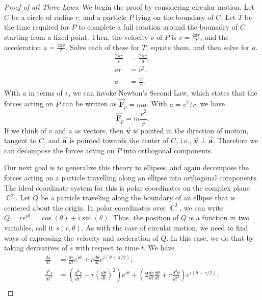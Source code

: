 \documentclass[letterpaper, 12pt]{amsart}
\DeclareMathOperator{\C}{\mathbb{C}}				%
\newcommand{\bvec}[1]{{\vec{\mathbf{#1}}}}			%
\theoremstyle{definition}  							%
\begin{document}
			\begin{proof}[Proof of all Three Laws]
			We begin the proof by considering circular motion.
			Let $C$ be a circle of radius $r$, and a particle $P$ lying on the boundary of $C$.
			Let $T$ be the time required for $P$ to complete a full rotation around the bounadry of $C$ starting from a fixed point.
			Then, the velocity $v$ of $P$ is $v = \tfrac{2\pi r}{T}$, and the acceleration $a = \tfrac{2\pi v}{T}$.
			Solve each of these for $T$, equate them, and then solve for $a$.
				\begin{align*}
					\frac{2\pi r}{v} &= \frac{2\pi v}{a}, \\
					ar &= v^2, \\
					a &= \frac{v^2}{r}.
				\end{align*}
			With $a$ in terms of $v$, we can invoke Newton's Second Law, which states that the forces acting on $P$ can be written as $\bvec{F}_{p} = ma$.
			With $a = v^2/r$, we have $$\bvec{F}_{p} = m \frac{v^2}{r}.$$
			If we think of $v$ and $a$ as vectors, then $\bvec{v}$ is pointed in the direction of motion, tangent to $C$, and $\bvec{a}$ is pointed towards the center of $C$, i.e., $\bvec{v} \perp \bvec{a}$.
			Therefore we can decompose the forces acting on $P$ into orthogonal components.

			Our next goal is to generalize this theory to ellipses, and again decompose the forces acting on a particle travelling along an ellipse into orthogonal components.
			The ideal coordinate system for this is polar coordinates on the complex plane $\C^2$.
			Let $Q$ be a particle traveling along the boundary of an ellipse that is centered about the origin.
			In polar coordinates over $\C^2$, we can write $Q = r e^{i\theta} = \cos(\theta) + i \sin(\theta)$.
			Thus, the position of $Q$ is a function in two variables, call it $s(r,\theta)$.
			As with the case of circular motion, we need to find ways of expressing the velocity and accleration of $Q$.
			In this case, we do that by taking derivatives of $s$ with respect to time $t$.
			We have
				\begin{align*}
					\frac{ds}{dt} &= \frac{dr}{dt}e^{i\theta} + r\frac{d\theta}{dt}e^{i(\theta + \pi/2)}; \\
					\frac{d^2s}{dt^2} &= \left( \frac{d^2r}{dt^2} - r\left(\frac{d\theta}{dt}\right)^2 \right)e^{i\theta} + \left( 2\frac{dr}{dt}\frac{d\theta}{dt} + r\frac{d^2\theta}{dt^2} \right)e^{i(\theta + \pi/2)}; \\
				\end{align*}
			
			\end{proof}
	\newpage
\end{document}
